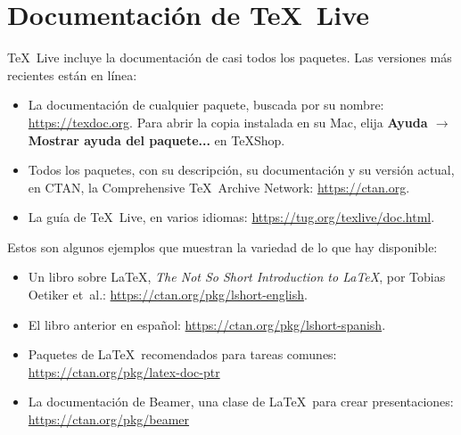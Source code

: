\documentclass[11pt, oneside]{article}
\begin{document}
\pagestyle{empty}

\vspace*{-1.0cm}
\enlargethispage{2.0cm}

\section{Documentación de \TeX\ Live}

\TeX\ Live incluye la documentación de casi todos los paquetes. Las versiones más recientes están en línea:

\begin{itemize}
\item La documentación de cualquier paquete, buscada por su nombre:
\url{https://texdoc.org}. Para abrir la copia instalada en su Mac, elija
\textbf{Ayuda $\rightarrow$ Mostrar ayuda del paquete...} en TeXShop.

\item Todos los paquetes, con su descripción, su documentación y su versión actual, en
CTAN, la Comprehensive \TeX\ Archive Network: \url{https://ctan.org}.

\item La guía de \TeX\ Live, en varios idiomas:
\url{https://tug.org/texlive/doc.html}.
\end{itemize}

Estos son algunos ejemplos que muestran la variedad de lo que hay disponible:

\begin{itemize}

\item Un libro sobre \LaTeX, \emph{The Not So Short Introduction to \LaTeX}, por Tobias Oetiker et~al.:
\url{https://ctan.org/pkg/lshort-english}.

\item El libro anterior en español:
\url{https://ctan.org/pkg/lshort-spanish}.

\item Paquetes de \LaTeX\ recomendados para tareas comunes:
\url{https://ctan.org/pkg/latex-doc-ptr}

\item La documentación de Beamer, una clase de \LaTeX\ para crear presentaciones:
\url{https://ctan.org/pkg/beamer}

\end{itemize}
\end{document}
